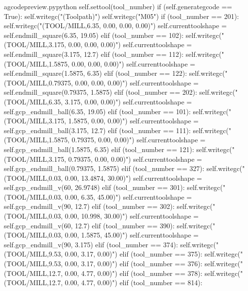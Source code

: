 \documentclass{ltxdoc}
\begin{document}
\begin{writecode}{a}{gcodepreview.py}{python}
        self.settool(tool_number)
        if (self.generategcode == True):
            self.writegc("(Toolpath)")
            self.writegc("M05")
        if (tool_number == 201):
            self.writegc("(TOOL/MILL,6.35, 0.00, 0.00, 0.00)")
            self.currenttoolshape = self.endmill_square(6.35, 19.05)
        elif (tool_number == 102):
            self.writegc("(TOOL/MILL,3.175, 0.00, 0.00, 0.00)")
            self.currenttoolshape = self.endmill_square(3.175, 12.7)
        elif (tool_number == 112):
            self.writegc("(TOOL/MILL,1.5875, 0.00, 0.00, 0.00)")
            self.currenttoolshape = self.endmill_square(1.5875, 6.35)
        elif (tool_number == 122):
            self.writegc("(TOOL/MILL,0.79375, 0.00, 0.00, 0.00)")
            self.currenttoolshape = self.endmill_square(0.79375, 1.5875)
        elif (tool_number == 202):
            self.writegc("(TOOL/MILL,6.35, 3.175, 0.00, 0.00)")
            self.currenttoolshape = self.gcp_endmill_ball(6.35, 19.05)
        elif (tool_number == 101):
            self.writegc("(TOOL/MILL,3.175, 1.5875, 0.00, 0.00)")
            self.currenttoolshape = self.gcp_endmill_ball(3.175, 12.7)
        elif (tool_number == 111):
            self.writegc("(TOOL/MILL,1.5875, 0.79375, 0.00, 0.00)")
            self.currenttoolshape = self.gcp_endmill_ball(1.5875, 6.35)
        elif (tool_number == 121):
            self.writegc("(TOOL/MILL,3.175, 0.79375, 0.00, 0.00)")
            self.currenttoolshape = self.gcp_endmill_ball(0.79375, 1.5875)
        elif (tool_number == 327):
            self.writegc("(TOOL/MILL,0.03, 0.00, 13.4874, 30.00)")
            self.currenttoolshape = self.gcp_endmill_v(60, 26.9748)
        elif (tool_number == 301):
            self.writegc("(TOOL/MILL,0.03, 0.00, 6.35, 45.00)")
            self.currenttoolshape = self.gcp_endmill_v(90, 12.7)
        elif (tool_number == 302):
            self.writegc("(TOOL/MILL,0.03, 0.00, 10.998, 30.00)")
            self.currenttoolshape = self.gcp_endmill_v(60, 12.7)
        elif (tool_number == 390):
            self.writegc("(TOOL/MILL,0.03, 0.00, 1.5875, 45.00)")
            self.currenttoolshape = self.gcp_endmill_v(90, 3.175)
        elif (tool_number == 374):
            self.writegc("(TOOL/MILL,9.53, 0.00, 3.17, 0.00)")
        elif (tool_number == 375):
            self.writegc("(TOOL/MILL,9.53, 0.00, 3.17, 0.00)")
        elif (tool_number == 376):
            self.writegc("(TOOL/MILL,12.7, 0.00, 4.77, 0.00)")
        elif (tool_number == 378):
            self.writegc("(TOOL/MILL,12.7, 0.00, 4.77, 0.00)")
        elif (tool_number == 814):

\end{writecode}
\end{document}
